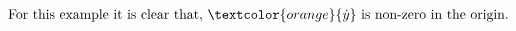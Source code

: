 \documentclass[preview]{standalone}
\begin{document}
\begin{align*}
\text{For this example it is clear that, } \textcolor{orange}{\dot y } \text{ is non-zero in the origin.}
\end{align*}
\end{document}

